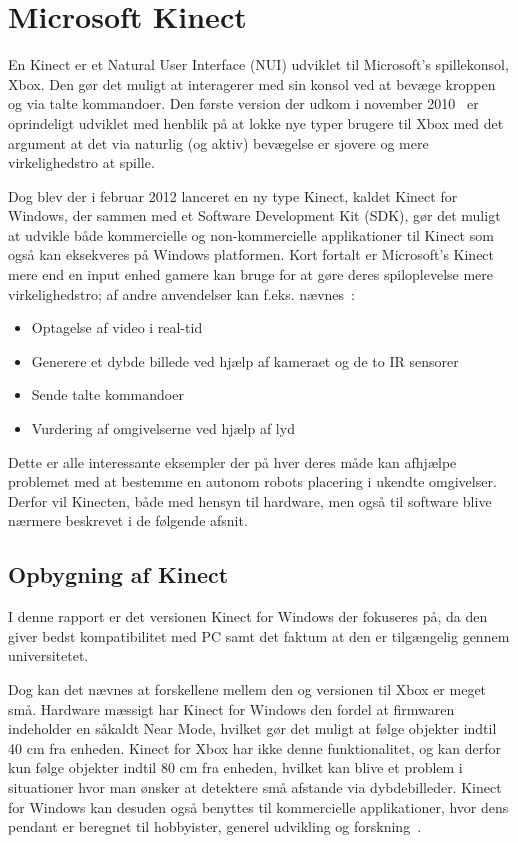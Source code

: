 \section{Microsoft Kinect}
En Kinect er et Natural User Interface (NUI) udviklet til Microsoft's spillekonsol, Xbox.
Den gør det muligt at interagerer med sin konsol ved at bevæge kroppen og via talte kommandoer.
Den første version der udkom i november 2010~\cite{kinectWiki} er oprindeligt udviklet med henblik på at lokke nye typer brugere til Xbox med det argument at det via naturlig (og aktiv) bevægelse er sjovere og mere virkelighedstro at spille.

Dog blev der i februar 2012 lanceret en ny type Kinect, kaldet Kinect for Windows, der sammen med et Software Development Kit (SDK), gør det muligt at udvikle både kommercielle og non-kommercielle applikationer til Kinect som også kan eksekveres på Windows platformen.
Kort fortalt er Microsoft's Kinect mere end en input enhed gamere kan bruge for at gøre deres spiloplevelse mere virkelighedstro; af andre anvendelser kan f.eks. nævnes~\cite[s.~17]{kinectProgrammingGuide}:

\begin{itemize}
\item Optagelse af video i real-tid
\item Generere et dybde billede ved hjælp af kameraet og de to IR sensorer
\item Sende talte kommandoer
\item Vurdering af omgivelserne ved hjælp af lyd
\end{itemize}

Dette er alle interessante eksempler der på hver deres måde kan afhjælpe problemet med at bestemme en autonom robots placering i ukendte omgivelser.
Derfor vil Kinecten, både med hensyn til hardware, men også til software blive nærmere beskrevet i de følgende afsnit.


\subsection{Opbygning af Kinect}
I denne rapport er det versionen Kinect for Windows der fokuseres på, da den giver bedst kompatibilitet med PC samt det faktum at den er tilgængelig gennem universitetet.

Dog kan det nævnes at forskellene mellem den og versionen til Xbox er meget små.
Hardware mæssigt har Kinect for Windows den fordel at firmwaren indeholder en såkaldt Near Mode, hvilket gør det muligt at følge objekter indtil 40 cm fra enheden.
Kinect for Xbox har ikke denne funktionalitet, og kan derfor kun følge objekter indtil 80 cm fra enheden, hvilket kan blive et problem i situationer hvor man ønsker at detektere små afstande via dybdebilleder.
Kinect for Windows kan desuden også benyttes til kommercielle applikationer, hvor dens pendant er beregnet til hobbyister, generel udvikling og forskning~\cite[s.~16]{kinectProgrammingGuide}.

